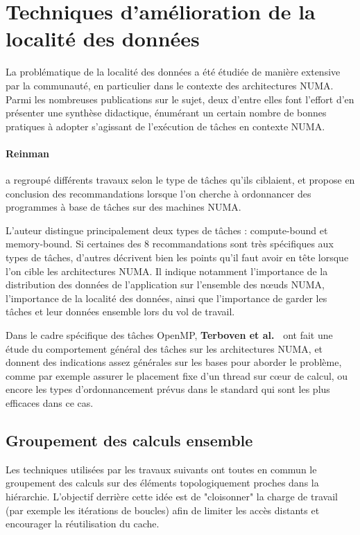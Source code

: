 \section{Techniques d'amélioration de la localité des données}\label{sec:rw:numa}


La problématique de la localité des données a été étudiée de manière extensive par la communauté, en particulier dans le contexte des architectures NUMA.
Parmi les nombreuses publications sur le sujet, deux d'entre elles font l'effort d'en présenter une synthèse didactique, énumérant un certain nombre de bonnes pratiques à adopter s'agissant de l'exécution de tâches en contexte NUMA.

\paragraph{Reinman~\cite{Reinman2015}} a regroupé différents travaux selon le type de tâches qu'ils ciblaient, et propose en conclusion des recommandations lorsque l'on cherche à ordonnancer des programmes à base de tâches sur des machines NUMA.

L'auteur distingue principalement deux types de tâches : compute-bound et memory-bound.
Si certaines des 8 recommandations sont très spécifiques aux types de tâches, d'autres décrivent bien les points qu'il faut avoir en tête lorsque l'on cible les architectures NUMA.
Il indique notamment l'importance de la distribution des données de l'application sur l'ensemble des nœuds NUMA, l'importance de la localité des données, ainsi que l'importance de garder les tâches et leur données ensemble lors du vol de travail.

Dans le cadre spécifique des tâches OpenMP, \textbf{Terboven et al.~\cite{Terboven2012}} ont fait une étude du comportement général des tâches sur les architectures NUMA, et donnent des indications assez générales sur les bases pour aborder le problème, comme par exemple assurer le placement fixe d'un thread sur cœur de calcul, ou encore les types d'ordonnancement prévus dans le standard qui sont les plus efficaces dans ce cas.



\subsection{Groupement des calculs ensemble}

Les techniques utilisées par les travaux suivants ont toutes en commun le groupement des calculs sur des éléments topologiquement proches dans la hiérarchie.
L'objectif derrière cette idée est de "cloisonner" la charge de travail (par exemple les itérations de boucles) afin de limiter les accès distants et encourager la réutilisation du cache.

